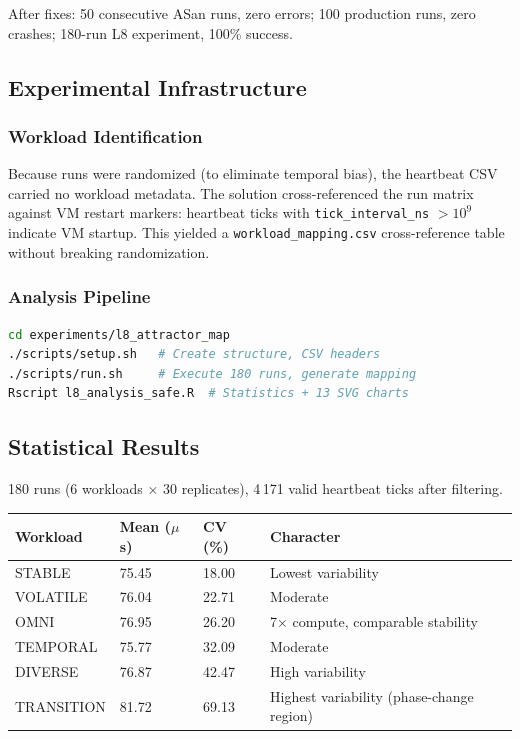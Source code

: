 After fixes: 50 consecutive ASan runs, zero errors; 100 production runs,
zero crashes; 180-run L8 experiment, 100\% success.

\subsection{Experimental Infrastructure}

\subsubsection{Workload Identification}

Because runs were randomized (to eliminate temporal bias), the heartbeat
CSV carried no workload metadata. The solution cross-referenced the run
matrix against VM restart markers: heartbeat ticks with
\texttt{tick\_interval\_ns} $> 10^9$ indicate VM startup. This yielded a
\texttt{workload\_mapping.csv} cross-reference table without breaking
randomization.

\subsubsection{Analysis Pipeline}

\begin{lstlisting}[language=bash]
cd experiments/l8_attractor_map
./scripts/setup.sh   # Create structure, CSV headers
./scripts/run.sh     # Execute 180 runs, generate mapping
Rscript l8_analysis_safe.R  # Statistics + 13 SVG charts
\end{lstlisting}

\subsection{Statistical Results}

180 runs (6 workloads $\times$ 30 replicates), 4\,171 valid heartbeat
ticks after filtering.

\begin{center}
\begin{tabular}{llll}
\toprule
Workload    & Mean ($\mu$s) & CV (\%) & Character \\
\midrule
STABLE      & 75.45 & 18.00 & Lowest variability \\
VOLATILE    & 76.04 & 22.71 & Moderate \\
OMNI        & 76.95 & 26.20 & 7$\times$ compute, comparable stability \\
TEMPORAL    & 75.77 & 32.09 & Moderate \\
DIVERSE     & 76.87 & 42.47 & High variability \\
TRANSITION  & 81.72 & 69.13 & Highest variability (phase-change region) \\
\bottomrule
\end{tabular}
\end{center}

